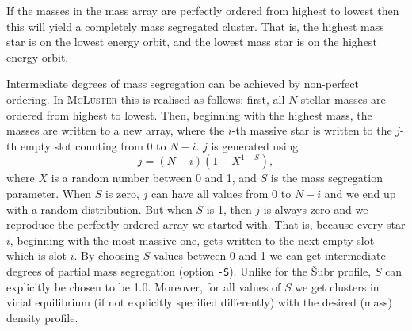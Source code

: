 \documentclass[useAMS,usenatbib]{mn2e}
\begin{document}
If the masses in the mass array are perfectly ordered from highest to lowest then this will yield a completely mass segregated cluster. That is, the highest mass star is on the lowest energy orbit, and the lowest mass star is on the highest energy orbit. 

Intermediate degrees of mass segregation can be achieved by non-perfect ordering. In \textsc{McLuster} this is realised as follows: first, all $N$ stellar masses are ordered from highest to lowest. Then, beginning with the highest mass, the masses are written to a new array, where the $i$-th massive star is written to the $j$-th empty slot counting from 0 to $N-i$. $j$ is generated using 
\begin{equation}
j = (N-i)\left(1-X^{1-S}\right),
\end{equation} 		
where $X$ is a random number between 0 and 1, and $S$ is the mass segregation parameter. When $S$ is zero, $j$ can have all values from 0 to $N-i$ and we end up with a random distribution. But when $S$ is 1, then $j$ is always zero and we reproduce the perfectly ordered array we started with. That is, because every star $i$, beginning with the most massive one, gets written to the next empty slot which is slot $i$. By choosing $S$ values between 0 and 1 we can get intermediate degrees of partial mass segregation (option \texttt{-S}). Unlike for the {\v S}ubr profile, $S$ can explicitly be chosen to be 1.0. Moreover, for all values of $S$ we get clusters in virial equilibrium (if not explicitly specified differently) with the desired (mass) density profile.
\end{document}
